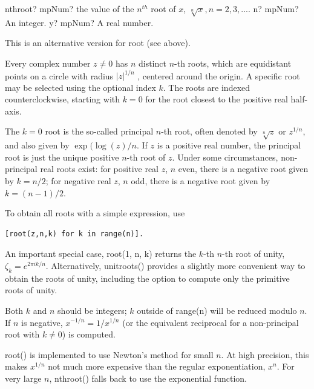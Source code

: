 \begin{mpFunctionsExtract}
	\mpFunctionTwo
	{nthroot? mpNum? the value of the $n^{th}$ root of $x$, $\sqrt[n]{x}, n=2,3,...$.}
	{n? mpNum? An integer.}
	{y? mpNum? A real number.}
\end{mpFunctionsExtract}

This is an alternative version for root (see above).



\vpara
Every complex number $z\neq 0$ has $n$ distinct $n$-th roots, which are equidistant points on a circle with radius $|z|^{1/n}$ , centered around the origin. A specific root may be selected using the optional index $k$. The roots are indexed counterclockwise, starting with $k=0$ for the root closest to the positive real half-axis.

\vpara
The $k=0$ root is the so-called principal $n$-th root, often denoted by $\sqrt[n]{z}$ or $z^{1/n}$, and also given by $\exp(\log(z)/n$. If $z$ is a positive real number, the principal root is just the unique positive $n$-th root of $z$. Under some circumstances, non-principal real roots exist: for positive real $z$, $n$ even, there is a negative root given by $k=n/2$; for negative real $z$, $n$ odd, there is a negative root given by $k=(n-1)/2$.

\vpara
To obtain all roots with a simple expression, use 
\begin{lstlisting}
[root(z,n,k) for k in range(n)].
\end{lstlisting}

An important special case, root(1, n, k) returns the $k$-th $n$-th root of unity, $\zeta_k = e^{2\pi ik/n}$. Alternatively, unitroots() provides a slightly more convenient way to obtain the roots of unity, including the option to compute only the primitive roots of unity.

\vpara
Both $k$ and $n$ should be integers; $k$ outside of range(n) will be reduced modulo $n$.  If $n$ is negative, $x^{-1/n} = 1/{x^{1/n}}$ (or the equivalent reciprocal for a non-principal root with $k \neq 0$) is computed.

\vpara
root() is implemented to use Newton's method for small $n$. At high precision, this makes $x^{1/n}$ not much more expensive than the regular exponentiation, $x^n$. For very
large $n$, nthroot() falls back to use the exponential function.


